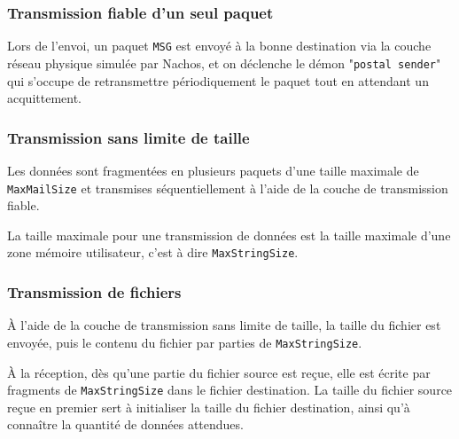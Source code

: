 \documentclass{article}
\begin{document}
{		\subsubsection{Transmission fiable d'un seul paquet }
			{Lors de l'envoi, un paquet \texttt{MSG} est envoyé à la bonne destination via la couche réseau physique simulée par Nachos, et on déclenche le démon "\texttt{postal sender}" qui s'occupe de retransmettre périodiquement le paquet tout en attendant un acquittement.
		\subsubsection{Transmission sans limite de taille}
			{Les données sont fragmentées en plusieurs paquets d'une taille maximale de \texttt{MaxMailSize} et transmises séquentiellement à l'aide de la couche de transmission fiable.}
			~\par{La taille maximale pour une transmission de données est la taille maximale d'une zone mémoire utilisateur, c'est à dire \texttt{MaxStringSize}.}
		\subsubsection{Transmission de fichiers}
			{À l'aide de la couche de transmission sans limite de taille, la taille du fichier est envoyée, puis le contenu du fichier par parties de \texttt{MaxStringSize}. }
			~\par{À la réception, dès qu'une partie du fichier source est reçue, elle est écrite par fragments de \texttt{MaxStringSize} dans le fichier destination. La taille du fichier source reçue en premier sert à initialiser la taille du fichier destination, ainsi qu'à connaître la quantité de données attendues.}
		

}}
\end{document}
